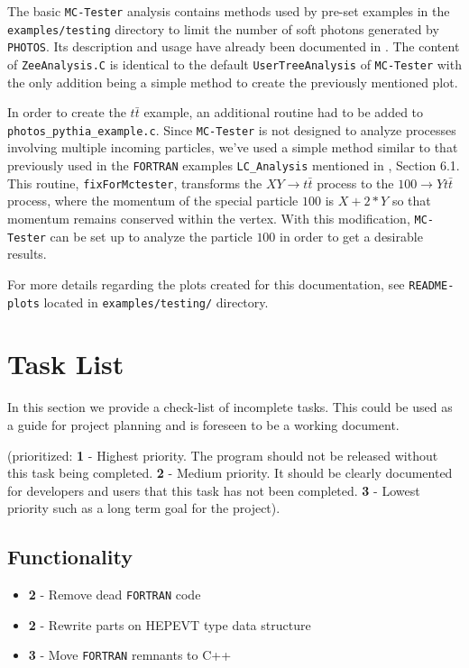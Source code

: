 \documentclass[]{Photos_interface_design}
\begin{document}
The basic {\tt MC-Tester} analysis contains methods used by pre-set examples
in the {\tt examples/testing} directory to limit the number of soft photons generated
by {\tt PHOTOS}. Its description and usage have already been documented in \cite{Davidson:2008ma}.
The content of {\tt ZeeAnalysis.C} is identical to the default {\tt UserTreeAnalysis}
of {\tt MC-Tester} with the only addition being a simple method to create
the previously mentioned plot.

In order to create the $t \bar t$ example, an additional routine had to be added to {\tt photos\_pythia\_example.c}.
Since {\tt MC-Tester} is not designed to analyze processes involving
multiple incoming particles, we've used a simple method similar to that previously
used in the {\tt FORTRAN} examples {\tt LC\_Analysis} mentioned in \cite{Golonka:2002rz}, Section 6.1.
This routine, {\tt fixForMctester}, transforms the $X Y \rightarrow t \bar t$
process to the $100 \rightarrow Y t \bar t$ process, where the momentum of the
special particle $100$ is $X + 2*Y$ so that momentum remains conserved
within the vertex. With this modification, {\tt MC-Tester} can be set
up to analyze the particle $100$ in order to get a desirable results.

For more details regarding the plots created for this documentation, see
{\tt README-plots} located in {\tt examples/testing/} directory.

\newpage

\section*{Task List}
In this section we provide a check-list of incomplete tasks.
This could be used as a guide for project planning and is foreseen
to be a working document. 

(prioritized: {\bf 1} - Highest priority. The program should not be
released without this task being completed. {\bf 2} - Medium priority.
It should be clearly documented for developers and users that this task has not
been completed. {\bf 3} - Lowest priority such as a long term goal 
for the project).

\subsection*{Functionality}
\begin{itemize}
  \item[\ding{111}]{\bf 2} - Remove dead {\tt FORTRAN} code
  \item[\ding{111}]{\bf 2} - Rewrite parts on HEPEVT type data structure
  \item[\ding{111}]{\bf 3} - Move {\tt FORTRAN} remnants to C++
\end{itemize}
\end{document}
